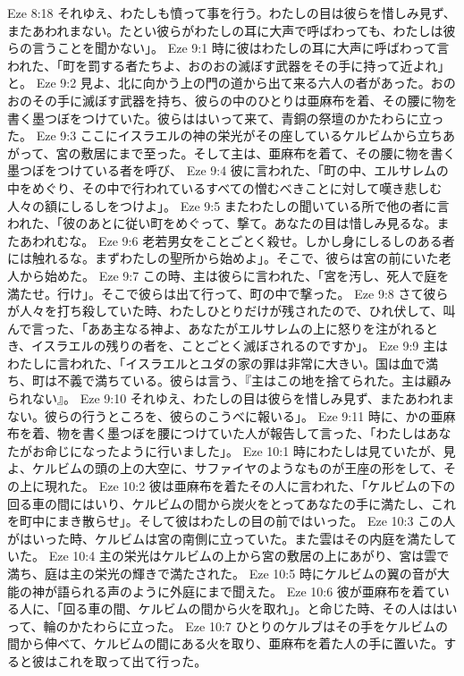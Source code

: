 Eze 8:18  それゆえ、わたしも憤って事を行う。わたしの目は彼らを惜しみ見ず、またあわれまない。たとい彼らがわたしの耳に大声で呼ばわっても、わたしは彼らの言うことを聞かない」。
Eze 9:1  時に彼はわたしの耳に大声に呼ばわって言われた、「町を罰する者たちよ、おのおの滅ぼす武器をその手に持って近よれ」と。
Eze 9:2  見よ、北に向かう上の門の道から出て来る六人の者があった。おのおのその手に滅ぼす武器を持ち、彼らの中のひとりは亜麻布を着、その腰に物を書く墨つぼをつけていた。彼らははいって来て、青銅の祭壇のかたわらに立った。
Eze 9:3  ここにイスラエルの神の栄光がその座しているケルビムから立ちあがって、宮の敷居にまで至った。そして主は、亜麻布を着て、その腰に物を書く墨つぼをつけている者を呼び、
Eze 9:4  彼に言われた、「町の中、エルサレムの中をめぐり、その中で行われているすべての憎むべきことに対して嘆き悲しむ人々の額にしるしをつけよ」。
Eze 9:5  またわたしの聞いている所で他の者に言われた、「彼のあとに従い町をめぐって、撃て。あなたの目は惜しみ見るな。またあわれむな。
Eze 9:6  老若男女をことごとく殺せ。しかし身にしるしのある者には触れるな。まずわたしの聖所から始めよ」。そこで、彼らは宮の前にいた老人から始めた。
Eze 9:7  この時、主は彼らに言われた、「宮を汚し、死人で庭を満たせ。行け」。そこで彼らは出て行って、町の中で撃った。
Eze 9:8  さて彼らが人々を打ち殺していた時、わたしひとりだけが残されたので、ひれ伏して、叫んで言った、「ああ主なる神よ、あなたがエルサレムの上に怒りを注がれるとき、イスラエルの残りの者を、ことごとく滅ぼされるのですか」。
Eze 9:9  主はわたしに言われた、「イスラエルとユダの家の罪は非常に大きい。国は血で満ち、町は不義で満ちている。彼らは言う、『主はこの地を捨てられた。主は顧みられない』。
Eze 9:10  それゆえ、わたしの目は彼らを惜しみ見ず、またあわれまない。彼らの行うところを、彼らのこうべに報いる」。
Eze 9:11  時に、かの亜麻布を着、物を書く墨つぼを腰につけていた人が報告して言った、「わたしはあなたがお命じになったように行いました」。
Eze 10:1  時にわたしは見ていたが、見よ、ケルビムの頭の上の大空に、サファイヤのようなものが王座の形をして、その上に現れた。
Eze 10:2  彼は亜麻布を着たその人に言われた、「ケルビムの下の回る車の間にはいり、ケルビムの間から炭火をとってあなたの手に満たし、これを町中にまき散らせ」。そして彼はわたしの目の前ではいった。
Eze 10:3  この人がはいった時、ケルビムは宮の南側に立っていた。また雲はその内庭を満たしていた。
Eze 10:4  主の栄光はケルビムの上から宮の敷居の上にあがり、宮は雲で満ち、庭は主の栄光の輝きで満たされた。
Eze 10:5  時にケルビムの翼の音が大能の神が語られる声のように外庭にまで聞えた。
Eze 10:6  彼が亜麻布を着ている人に、「回る車の間、ケルビムの間から火を取れ」。と命じた時、その人ははいって、輪のかたわらに立った。
Eze 10:7  ひとりのケルブはその手をケルビムの間から伸べて、ケルビムの間にある火を取り、亜麻布を着た人の手に置いた。すると彼はこれを取って出て行った。
